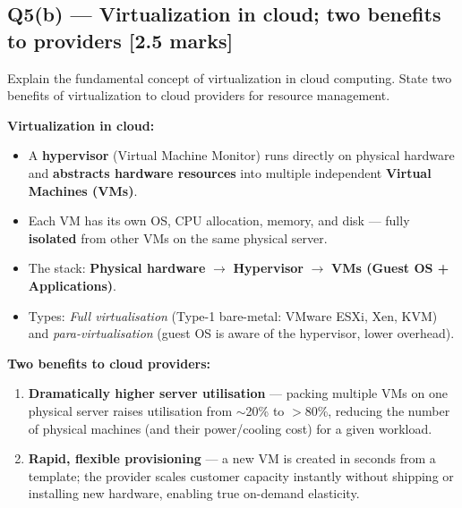 \documentclass[12pt, a4paper]{article}
\newenvironment{qbox}{\begin{mdframed}[style=qframe]}{\end{mdframed}}
\newenvironment{solbox}{\begin{mdframed}[style=solframe]}{\end{mdframed}}
\newcommand{\qmarks}[1]{\hfill\textbf{\color{orange!70!black}[#1 marks]}}
\begin{document}
\subsection{Q5(b) --- Virtualization in cloud; two benefits to providers
  \texorpdfstring{\qmarks{2.5}}{}}
\begin{qbox}Explain the fundamental concept of virtualization in cloud computing. State two
benefits of virtualization to cloud providers for resource management.\end{qbox}
\begin{solbox}
\textbf{Virtualization in cloud:}
\begin{itemize}[leftmargin=1.4cm, itemsep=2pt]
  \item A \textbf{hypervisor} (Virtual Machine Monitor) runs directly on physical hardware
    and \textbf{abstracts hardware resources} into multiple independent \textbf{Virtual
    Machines (VMs)}.
  \item Each VM has its own OS, CPU allocation, memory, and disk --- fully \textbf{isolated}
    from other VMs on the same physical server.
  \item The stack: \textbf{Physical hardware}
    $\rightarrow$ \textbf{Hypervisor}
    $\rightarrow$ \textbf{VMs (Guest OS + Applications)}.
  \item Types: \textit{Full virtualisation} (Type-1 bare-metal: VMware ESXi, Xen, KVM) and
    \textit{para-virtualisation} (guest OS is aware of the hypervisor, lower overhead).
\end{itemize}

\textbf{Two benefits to cloud providers:}
\begin{enumerate}[leftmargin=1.6cm, itemsep=3pt]
  \item \textbf{Dramatically higher server utilisation} --- packing multiple VMs on one
    physical server raises utilisation from $\sim$20\% to $>$80\%, reducing the number of
    physical machines (and their power/cooling cost) for a given workload.
  \item \textbf{Rapid, flexible provisioning} --- a new VM is created in seconds from a
    template; the provider scales customer capacity instantly without shipping or installing
    new hardware, enabling true on-demand elasticity.
\end{enumerate}
\end{solbox}

\end{document}
